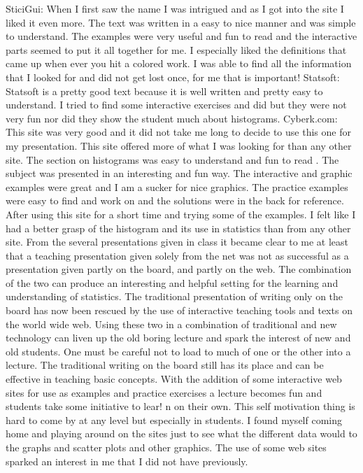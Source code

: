       SticiGui: When I first saw the name I was intrigued and as I got into the site I liked it even more. The text was written in a easy to nice manner and was simple to understand. The examples were very useful and fun to read and the interactive parts seemed to put it all together for me. I especially liked the definitions that came up when ever you hit a colored work. I was able to find all the information that I looked for and did not get lost once, for me that is important! 
     Statsoft: Statsoft is a pretty good text because it is well written and pretty easy to understand. I tried to find some interactive exercises and did but they were not very fun nor did they show the student much about histograms.
     Cyberk.com: This site was very good and it did not take me long to decide to use this one for my presentation. This site offered more of what I was looking for than any other site. The section on histograms was easy to understand and fun to read . The subject was presented in an interesting and fun way. The interactive and graphic examples were great and I am a sucker for nice graphics. The practice examples were easy to find and work on and the solutions were in the back for reference. After using this site for a short time and trying some of the examples. I felt like I had a better grasp of the histogram and its use in statistics than from any other site. 
     From the several presentations given in class it became clear to me at least that a teaching presentation given solely from the net was not as successful as a presentation given partly on the board, and partly on the web. The combination of the two can produce an interesting and helpful setting for the learning and understanding of statistics. The traditional presentation of writing only on the board has now been rescued by the use of interactive teaching tools and texts on the world wide web. Using these two in a combination of traditional and new technology can liven up the old boring lecture and spark the interest of new and old students. One must be careful not to load to much of one or the other into a lecture. The traditional writing on the board still has its place and can be effective in teaching basic concepts. With the addition of some interactive web sites for use as examples and practice exercises a lecture becomes fun and students take some initiative to lear!
n on their own. This self motivation thing is hard to come by at any level but especially in students. I found myself coming home and playing around on the sites just to see what the different data would to the graphs and scatter plots and other graphics. The use of some web sites sparked an interest in me that I did not have previously.
